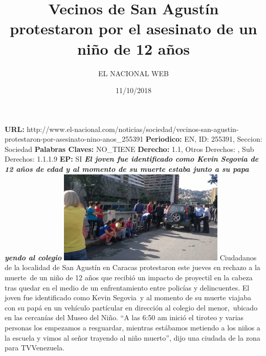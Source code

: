 \documentclass{article}%
\title{\textbf{Vecinos de San Agustín protestaron por el asesinato de un niño de 12 años}}%
\author{EL NACIONAL WEB}%
\date{11/10/2018}%
\begin{document}
%
\normalsize%
\maketitle%
\textbf{URL: }%
http://www.el{-}nacional.com/noticias/sociedad/vecinos{-}san{-}agustin{-}protestaron{-}por{-}asesinato{-}nino{-}anos\_255391\newline%
%
\textbf{Periodico: }%
EN, %
ID: %
255391, %
Seccion: %
Sociedad\newline%
%
\textbf{Palabras Claves: }%
NO\_TIENE\newline%
%
\textbf{Derecho: }%
1.1, %
Otros Derechos: %
, %
Sub Derechos: %
1.1.1.9\newline%
%
\textbf{EP: }%
SI\newline%
\newline%
%
\textbf{\textit{El joven fue identificado como Kevin Segovia de 12 años de edad y al momento de su muerte estaba junto a su papa yendo al colegio}}%
\newline%
\newline%
%
\includegraphics[width=300px]{8.jpg}%
\newline%
%
Ciudadanos de la localidad de San Agustín en Caracas protestaron este jueves en rechazo a la muerte~de un niño de 12 años que recibió un impacto de proyectil en la cabeza tras quedar en el medio de un enfrentamiento entre policías y delincuentes.%
\newline%
%
El joven fue identificado como Kevin Segovia~y al momento de su muerte viajaba con su papá en un vehículo partícular en dirección al colegio del menor,~ubicado en las cercanías del Museo del Niño.%
\newline%
%
“A las 6:50 am inició el tiroteo y varias personas los empezamos a resguardar, mientras estábamos metiendo a los niños a la escuela y vimos al señor trayendo al niño muerto”, dijo una ciudada de la zona para TVVenezuela.%
\newline%
%
\end{document}
